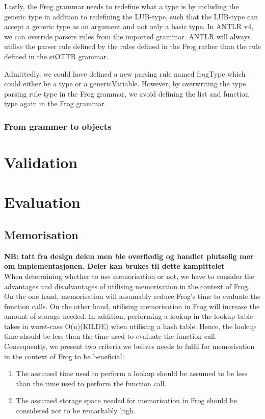 \para


\para
Lastly, the Frog grammar needs to redefine what a type is by including the generic type in addition to redefining the LUB-type, such that the LUB-type can accept a generic type as an argument and not only a basic type. In ANTLR v4, we can override parsers rules from the imported grammar. ANTLR will always utilise the parser rule defined by the rules defined in the Frog rather than the rule defined in the stOTTR grammar.

\para


\para 
Admittedly, we could have defined a new parsing rule named frogType which could either be a type or a genericVariable. However, by overwriting the type parsing rule type in the Frog grammar, we avoid defining the list and function type again in the Frog grammar.

\subsubsection{From grammer to objects}

\section{Validation}
\label{implValidation}

\section{Evaluation}
\label{implementation_evaluation}

\subsection{Memorisation}
\textbf{NB: tatt fra design delen men ble overflødig og handlet plutselig mer om implementasjonen. Deler kan brukes til dette kampittelet}
\\
When determining whether to use memorisation or not, we have to consider the advantages and disadvantages of utilising memorisation in the context of Frog. On the one hand, memorisation will assumably reduce Frog's time to evaluate the function calls. On the other hand, utilising memorisation in Frog will increase the amount of storage needed. In addition, performing a lookup in the lookup table takes in worst-case O(n)(KILDE) when utilising a hash table. Hence, the lookup time should be less than the time used to evaluate the function call. Consequently, we present two criteria we belives needs to fulfil for memorisation in the context of Frog to be beneficial:
\begin{enumerate}
    \item The assumed time used to perform a lookup should be assumed to be less than the time used to perform the function call.
    \item The assumed storage space needed for memorisation in Frog should be considered not to be remarkably high. 
\end{enumerate}

